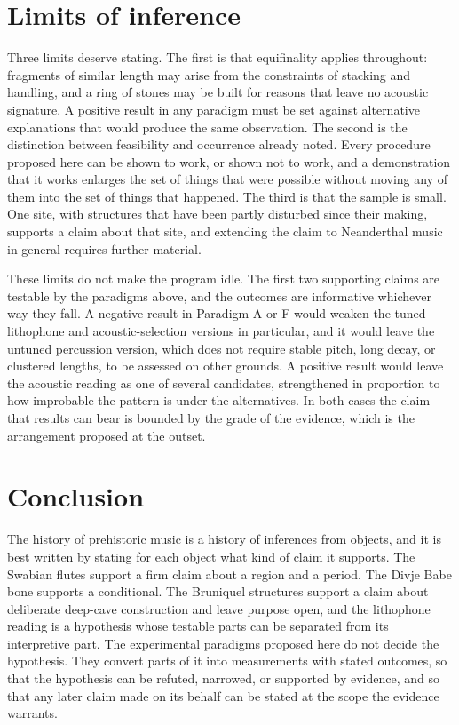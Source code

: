 \documentclass[12pt]{article}
\begin{document}
\section{Limits of inference}

Three limits deserve stating. The first is that equifinality applies throughout: fragments of similar length may arise from the constraints of stacking and handling, and a ring of stones may be built for reasons that leave no acoustic signature. A positive result in any paradigm must be set against alternative explanations that would produce the same observation. The second is the distinction between feasibility and occurrence already noted. Every procedure proposed here can be shown to work, or shown not to work, and a demonstration that it works enlarges the set of things that were possible without moving any of them into the set of things that happened. The third is that the sample is small. One site, with structures that have been partly disturbed since their making, supports a claim about that site, and extending the claim to Neanderthal music in general requires further material.

These limits do not make the program idle. The first two supporting claims are testable by the paradigms above, and the outcomes are informative whichever way they fall. A negative result in Paradigm A or F would weaken the tuned-lithophone and acoustic-selection versions in particular, and it would leave the untuned percussion version, which does not require stable pitch, long decay, or clustered lengths, to be assessed on other grounds. A positive result would leave the acoustic reading as one of several candidates, strengthened in proportion to how improbable the pattern is under the alternatives. In both cases the claim that results can bear is bounded by the grade of the evidence, which is the arrangement proposed at the outset.

\section{Conclusion}

The history of prehistoric music is a history of inferences from objects, and it is best written by stating for each object what kind of claim it supports. The Swabian flutes support a firm claim about a region and a period. The Divje Babe bone supports a conditional. The Bruniquel structures support a claim about deliberate deep-cave construction and leave purpose open, and the lithophone reading is a hypothesis whose testable parts can be separated from its interpretive part. The experimental paradigms proposed here do not decide the hypothesis. They convert parts of it into measurements with stated outcomes, so that the hypothesis can be refuted, narrowed, or supported by evidence, and so that any later claim made on its behalf can be stated at the scope the evidence warrants.
\end{document}
